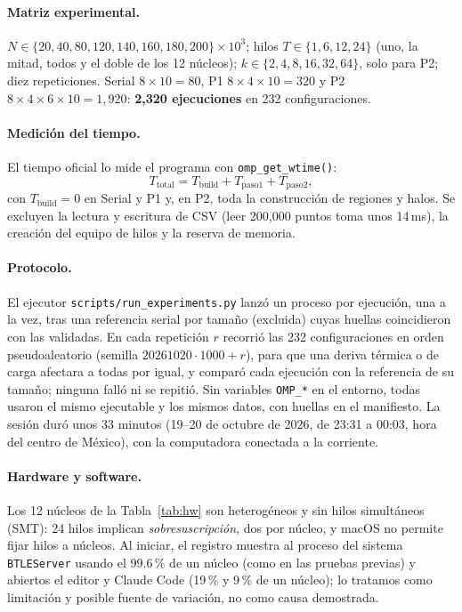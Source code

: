 \documentclass[11pt,letterpaper]{article}
\newcommand{\code}[1]{\texttt{#1}}
\begin{document}
\paragraph{Matriz experimental.} $N\in\{20,40,80,120,140,160,180,200\}\times10^3$; hilos $T\in\{1,6,12,24\}$ (uno,
la mitad, todos y el doble de los 12 núcleos); $k\in\{2,4,8,16,32,64\}$, solo para P2; diez repeticiones. Serial
$8\times10=80$, P1 $8\times4\times10=320$ y P2 $8\times4\times6\times10=1{,}920$: \textbf{2,320 ejecuciones} en 232
configuraciones.

\paragraph{Medición del tiempo.} El tiempo oficial lo mide el programa con \code{omp\_get\_wtime()}:
\begin{equation}\label{eq:ttotal}
  T_{\mathrm{total}}=T_{\mathrm{build}}+T_{\mathrm{paso1}}+T_{\mathrm{paso2}},
\end{equation}
con $T_{\mathrm{build}}=0$ en Serial y P1 y, en P2, toda la construcción de regiones y halos. Se excluyen la lectura y
escritura de CSV (leer 200,000 puntos toma unos 14\,ms), la creación del equipo de hilos y la reserva de memoria.

\paragraph{Protocolo.} El ejecutor \code{scripts/run\_experiments.py} lanzó un proceso por ejecución, una a la vez,
tras una referencia serial por tamaño (excluida) cuyas huellas coincidieron con las validadas. En cada repetición $r$
recorrió las 232 configuraciones en orden pseudoaleatorio (semilla $20261020\cdot1000+r$), para que una deriva
térmica o de carga afectara a todas por igual, y comparó cada ejecución con la referencia de su tamaño; ninguna
falló ni se repitió. Sin variables \code{OMP\_*} en el entorno, todas usaron el mismo ejecutable y los mismos datos,
con huellas en el manifiesto. La sesión duró unos 33 minutos (19--20 de octubre de 2026, de 23:31 a 00:03, hora del
centro de México), con la computadora conectada a la corriente.

\paragraph{Hardware y software.} Los 12 núcleos de la Tabla~\ref{tab:hw} son heterogéneos y sin hilos simultáneos
(SMT): 24 hilos implican \emph{sobresuscripción}, dos por núcleo, y macOS no permite fijar hilos a núcleos. Al
iniciar, el registro muestra al proceso del sistema \code{BTLEServer} usando el 99.6\,\% de un núcleo (como en las
pruebas previas) y abiertos el editor y Claude Code (19\,\% y 9\,\% de un núcleo); lo tratamos como limitación y
posible fuente de variación, no como causa demostrada.
\end{document}
